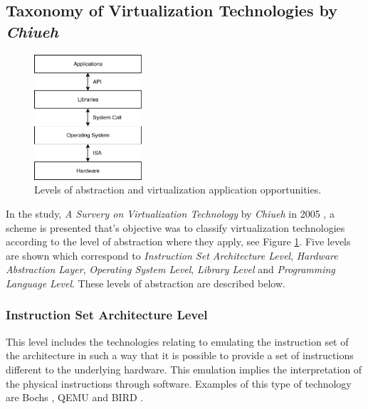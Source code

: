 	\subsection{Taxonomy of Virtualization Technologies by \textit{Chiueh}}

	\begin{figure}[!hbtp]
		\centering
		\includegraphics[width=4cm]{images/Chiueh2005.pdf}
		\vspace{-0.2cm}
		\caption{Levels of abstraction and virtualization application opportunities.\footnotemark[3]{}}
		\label{fig:VirtualizationOpportunities}
	\end{figure}
	
	
	In the study, \textit{A Survery on Virtualization Technology} by \textit{Chiueh} in 2005 \cite{Chiueh2005}, a scheme is presented that's objective was to classify virtualization technologies according to the level of abstraction where they apply, see Figure \ref{fig:VirtualizationOpportunities}. Five levels are shown which correspond to \textit{Instruction Set Architecture Level}, \textit{Hardware Abstraction Layer}, \textit{Operating System Level}, \textit{Library Level} and \textit{Programming Language Level}. These levels of abstraction are described below.
	
	\subsubsection{Instruction Set Architecture Level} 
	
	This level includes the technologies relating to emulating the instruction set of the architecture in such a way that it is possible to provide a set of instructions different to the underlying hardware. This emulation implies the interpretation of the physical instructions through software. Examples of this type of technology are Bochs \cite{Bochs2018}, QEMU \cite {QEMU2018} and BIRD \cite {Nanda2006}.
	
